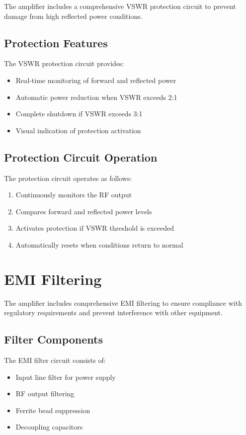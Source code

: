\documentclass[11pt,a4paper]{article}
\begin{document}
The amplifier includes a comprehensive VSWR protection circuit to prevent damage from high reflected power conditions.

\subsection{Protection Features}
The VSWR protection circuit provides:
\begin{itemize}
    \item Real-time monitoring of forward and reflected power
    \item Automatic power reduction when VSWR exceeds 2:1
    \item Complete shutdown if VSWR exceeds 3:1
    \item Visual indication of protection activation
\end{itemize}

\subsection{Protection Circuit Operation}
The protection circuit operates as follows:
\begin{enumerate}
    \item Continuously monitors the RF output
    \item Compares forward and reflected power levels
    \item Activates protection if VSWR threshold is exceeded
    \item Automatically resets when conditions return to normal
\end{enumerate}

\section{EMI Filtering}
\label{sec:emi_filtering}

The amplifier includes comprehensive EMI filtering to ensure compliance with regulatory requirements and prevent interference with other equipment.

\subsection{Filter Components}
The EMI filter circuit consists of:
\begin{itemize}
    \item Input line filter for power supply
    \item RF output filtering
    \item Ferrite bead suppression
    \item Decoupling capacitors
\end{itemize}
\end{document}

